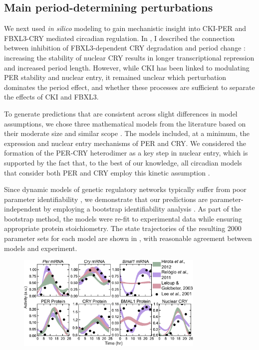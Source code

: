 \subsection{Main period-determining perturbations}

We next used {\it in silico} modeling to gain mechanistic insight into CKI-PER and FBXL3-CRY mediated circadian regulation. 
In , I described the connection between inhibition of FBXL3-dependent CRY degradation and period change \cite{Hirota2012}: increasing the stability of nuclear CRY results in longer transcriptional repression and increased period length. 
However, while CKI has been linked to modulating PER stability and nuclear entry, it remained unclear which perturbation dominates the period effect, and whether these processes are sufficient to separate the effects of CKI and FBXL3.

To generate predictions that are consistent across slight differences in model assumptions, we chose three mathematical models from the literature based on their moderate size and similar scope \cite{Hirota2012, Leloup2003, Relogio2011}. 
The models included, at a minimum, the expression and nuclear entry mechanisms of PER and CRY. 
We considered the formation of the PER-CRY heterodimer as a key step in nuclear entry, which is supported by the fact that, to the best of our knowledge, all circadian models that consider both PER and CRY employ this kinetic assumption \cite{Hirota2012, Relogio2011, Leloup2003, Forger2003, Mirsky2009}.

Since dynamic models of genetic regulatory networks typically suffer from poor parameter identifiability \cite{Gunawan2006}, we demonstrate that our predictions are parameter-independent by employing a bootstrap identifiability analysis \cite{St.John2013}. 
As part of the bootstrap method, the models were re-fit to experimental data \cite{Lee2001} while ensuring appropriate protein stoichiometry. 
The state trajectories of the resulting 2000 parameter sets for each model are shown in , with reasonable agreement between models and experiment.

\begin{figure}[h]
  \centering
  \includegraphics[width=0.8\textwidth]{chap4/figures/fig2.pdf}
  \label{fig:4.2}
\end{figure}


